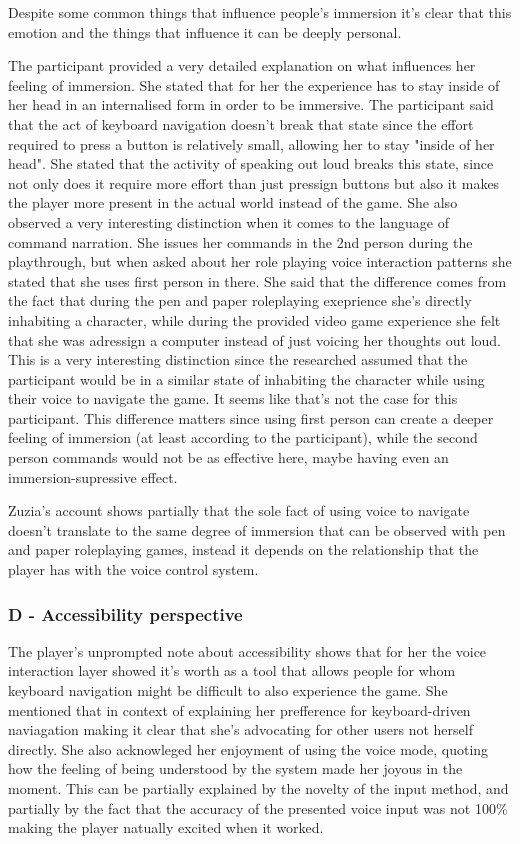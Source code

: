 Despite some common things that influence people's immersion it's clear that this emotion and the things that influence it can be deeply personal. 

The participant provided a very detailed explanation on what influences her feeling of immersion. She stated that for her the experience has to stay inside of her head in an internalised form in order to be immersive. The participant said that the act of keyboard navigation doesn't break that state since the effort required to press a button is relatively small, allowing her to stay "inside of her head".  She stated that the activity of speaking out loud breaks this state, since not only does it require more effort than just pressign buttons but also it makes the player more present in the actual world instead of the game. She also observed a very interesting distinction when it comes to the language of command narration. She issues her commands in the 2nd person during the playthrough, but when asked about her role playing voice interaction patterns she stated that she uses first person in there. She said that the difference comes from the fact that during the pen and paper roleplaying exeprience she's directly inhabiting a character, while during the provided video game experience she felt that she was adressign a computer instead of just voicing her thoughts out loud. 
This is a very interesting distinction since the researched assumed that the participant would be in a similar state of inhabiting the character while using their voice to navigate the game. It seems like that's not the case for this participant. 
This difference matters since using first person can create a deeper feeling of immersion (at least according to the participant), while the second person commands would not be as effective here, maybe having even an immersion-supressive effect. 


Zuzia's account shows partially that the sole fact of using voice to navigate doesn't translate to the same degree of immersion that can be observed with pen and paper roleplaying games, instead it depends on the relationship that the player has with the voice control system.

\subsubsection{D - Accessibility perspective}


The player's unprompted note about accessibility shows that for her the voice interaction layer showed it's worth as a tool that allows people for whom keyboard navigation might be difficult to also experience the game. She mentioned that in context of explaining her prefference for keyboard-driven naviagation making it clear that she's advocating for other users not herself directly. She also acknowleged her enjoyment of using the voice mode, quoting how the feeling of being understood by the system made her joyous in the moment. This can be partially explained by the novelty of the input method, and partially by the fact that the accuracy of the presented voice input was not 100\% making the player natually excited when it worked.





